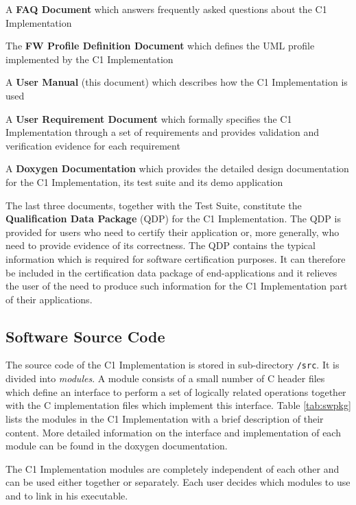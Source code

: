 \documentclass[a4paper,10pt]{article}
\newenvironment{fw_itemize}						%
{\begin{itemize}
  \setlength{\itemsep}{1mm}
  \setlength{\parskip}{0pt}
  \setlength{\parsep}{0pt}}
{\end{itemize}}
\begin{document}
\begin{fw_itemize}
\item A \textbf{FAQ Document} which answers frequently asked questions about the C1 Implementation
\item The \textbf{FW Profile Definition Document} which defines the UML profile implemented by the C1 Implementation
\item A \textbf{User Manual} (this document) which describes how the C1 Implementation is used
\item A \textbf{User Requirement Document} which formally specifies the C1 Implementation
through a set of requirements and provides validation and verification evidence for each requirement
\item A \textbf{Doxygen Documentation} which provides the detailed design documentation for the C1 Implementation, its test suite and its demo application
\end{fw_itemize}

The last three documents, together with the Test Suite, constitute the \textbf{Qualification Data Package} (QDP) for the C1 Implementation. The QDP is provided for users who need to certify their application or, more generally, who need to provide evidence of its correctness. The QDP contains the typical information which is required for software certification purposes. It can therefore be included in the certification data package of end-applications and it relieves the user of the need to produce such information for the C1 Implementation part of their applications.

\subsection{Software Source Code}\label{sec:sourceCode}
The source code of the C1 Implementation is stored in sub-directory \texttt{/src}. It is divided into \emph{modules}. A module consists of a small number of C header files which define an interface to perform a set of logically related operations together with the C implementation files which implement this interface. Table \ref{tab:swpkg} lists the modules in the C1 Implementation with a brief description of their content. More detailed information on the interface and implementation of each module can be found in the doxygen documentation.

The C1 Implementation modules are completely independent of each other and can be used either together or separately. Each user decides which modules to use and to link in his executable.
\end{document}
